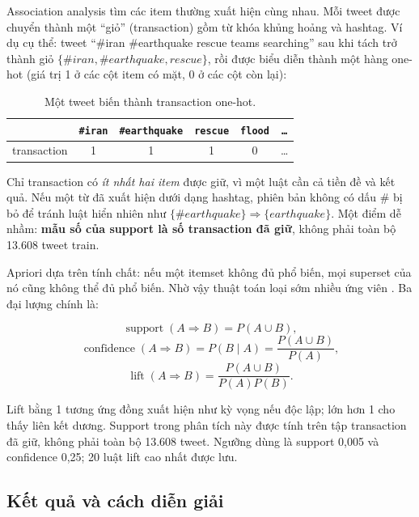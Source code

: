 Association analysis tìm các item thường xuất hiện cùng nhau. Mỗi tweet được
chuyển thành một ``giỏ'' (transaction) gồm từ khóa khủng hoảng và hashtag. Ví dụ
cụ thể: tweet ``\#iran \#earthquake rescue teams searching'' sau khi tách trở
thành giỏ \(\{\#iran, \#earthquake, rescue\}\), rồi được biểu diễn thành một hàng
one-hot (giá trị 1 ở các cột item có mặt, 0 ở các cột còn lại):

\begin{table}[H]\centering\small
\caption{Một tweet biến thành transaction one-hot.}
\begin{tabular}{lccccc}
\toprule
& \texttt{\#iran} & \texttt{\#earthquake} & \texttt{rescue} & \texttt{flood} & \texttt{\dots}\\
\midrule
transaction & 1 & 1 & 1 & 0 & \dots\\
\bottomrule
\end{tabular}
\end{table}

Chỉ transaction có \emph{ít nhất hai item} được giữ, vì một luật cần cả tiền đề
và kết quả. Nếu một từ đã xuất hiện dưới dạng hashtag, phiên bản không có dấu
\# bị bỏ để tránh luật hiển nhiên như
\(\{\#earthquake\}\Rightarrow\{earthquake\}\). Một điểm dễ nhầm:
\textbf{mẫu số của support là số transaction đã giữ}, không phải toàn bộ 13.608
tweet train.

Apriori dựa trên tính chất: nếu một itemset không đủ phổ biến, mọi superset của
nó cũng không thể đủ phổ biến. Nhờ vậy thuật toán loại sớm nhiều ứng viên
\cite{agrawal1994}. Ba đại lượng chính là:

\[
\operatorname{support}(A\Rightarrow B)=P(A\cup B),
\]
\[
\operatorname{confidence}(A\Rightarrow B)=P(B\mid A)
=\frac{P(A\cup B)}{P(A)},
\]
\[
\operatorname{lift}(A\Rightarrow B)
=\frac{P(A\cup B)}{P(A)P(B)}.
\]

Lift bằng 1 tương ứng đồng xuất hiện như kỳ vọng nếu độc lập; lớn hơn 1 cho thấy
liên kết dương. Support trong phân tích này được tính trên tập transaction đã
giữ, không phải toàn bộ 13.608 tweet. Ngưỡng dùng là support 0,005 và confidence
0,25; 20 luật lift cao nhất được lưu.

\subsection{Kết quả và cách diễn giải}

